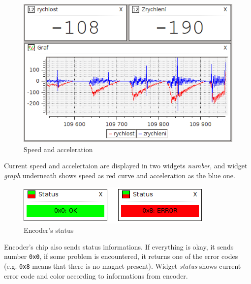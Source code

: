 \documentclass[12pt, a4paper, oneside]{article}
\newcommand{\It}{\textit}  %
\begin{document}
\begin{figure}[H]
\begin{center}
\includegraphics[width=\textwidth-60pt]{img/enc_spd.png}
\caption{Speed and acceleration}
\end{center}
\end{figure}
Current speed and accelertaion are displayed in two widgets \It{number}, and widget \It{graph} underneath shows speed as red curve and acceleration as the blue one.

\begin{figure}[H]
\begin{center}
\includegraphics[width=\textwidth]{img/enc_status.png}
\caption{Encoder's status}
\end{center}
\end{figure}
Encoder's chip also sends status informations. If everything is okay, it sends number \verb|0x0|, if some problem is encountered, it returns one of the error codes (e.g. \verb|0x8| means that there is no magnet present). Widget \It{status} shows current error code and color according to informations from encoder.
\end{document}
